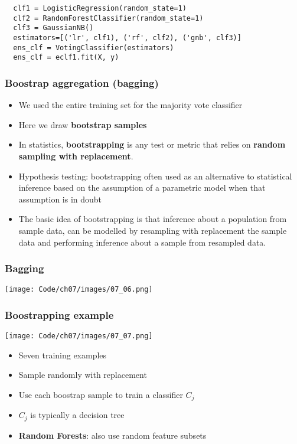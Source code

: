 \documentclass{beamer}
\begin{document}
\begin{frame}[fragile]
\small
\begin{verbatim}
  clf1 = LogisticRegression(random_state=1)
  clf2 = RandomForestClassifier(random_state=1)
  clf3 = GaussianNB()
  estimators=[('lr', clf1), ('rf', clf2), ('gnb', clf3)]
  ens_clf = VotingClassifier(estimators)
  ens_clf = eclf1.fit(X, y)
\end{verbatim}
\end{frame}

\begin{frame}
  \frametitle{Boostrap aggregation (bagging)}
  \begin{itemize}
  \item We used the entire training set for the majority vote classifier
  \item Here we draw \textbf{bootstrap samples}
  \item In statistics, \textbf{bootstrapping} is any test or metric that relies on \textbf{random sampling with replacement}.
  \item Hypothesis testing: bootstrapping often used as an alternative to statistical inference based on the assumption of a parametric model when that assumption is in doubt
  \item The basic idea of bootstrapping is that inference about a population from sample data, can be modelled by resampling with replacement the sample data and performing inference about a sample from resampled data.
  \end{itemize}
\end{frame}

\begin{frame}
  \frametitle{Bagging}
  \center
  \texttt{[image: Code/ch07/images/07\_06.png]}
\end{frame}

\begin{frame}
  \frametitle{Boostrapping example}
  \center
  \texttt{[image: Code/ch07/images/07\_07.png]}
  \begin{itemize}
  \item Seven training examples
  \item Sample randomly with replacement
  \item Use each boostrap sample to train a classifier $C_j$
  \item $C_j$ is typically a decision tree
  \item \textbf{Random Forests}: also use random feature subsets
  \end{itemize}

\end{frame}
\end{document}
